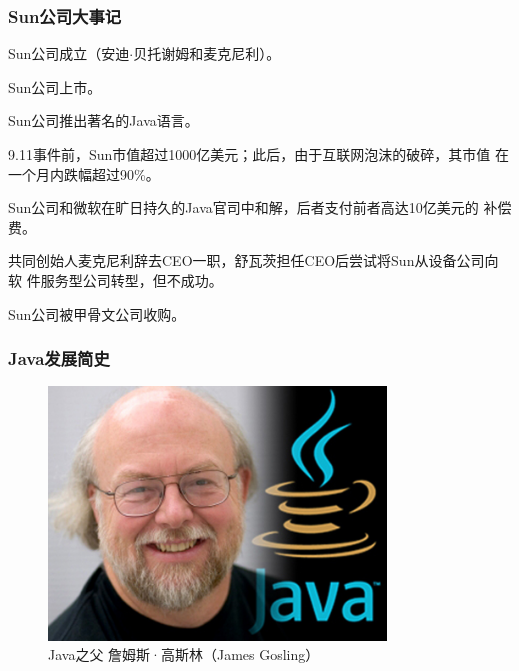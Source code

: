 \documentclass[hyperref={pdfpagelabels=false},compress,table]{beamer} %
\newcommand{\msyh}{\CJKfamily{MSYH}}
\begin{document}
\begin{frame}[fragile] %
\frametitle{Sun公司大事记}
\begin{description}\msyh\small
\item[\fbox{1982}] Sun公司成立（安迪$\cdot$贝托谢姆和麦克尼利）。
\item[\fbox{1986}] Sun公司上市。
\item[\fbox{1985}] Sun公司推出著名的Java语言。
\item[\fbox{2011}] 9.11事件前，Sun市值超过1000亿美元；此后，由于互联网泡沫的破碎，其市值
  在一个月内跌幅超过90\%。
\item[\fbox{2004}] Sun公司和微软在旷日持久的Java官司中和解，后者支付前者高达10亿美元的
  补偿费。
\item[\fbox{2006}] 共同创始人麦克尼利辞去CEO一职，舒瓦茨担任CEO后尝试将Sun从设备公司向软
  件服务型公司转型，但不成功。
\item[\fbox{2010}] Sun公司被甲骨文公司收购。
\end{description}
\end{frame}

\begin{frame}[fragile] %
\frametitle{Java发展简史}
\begin{figure}
\centering
\includegraphics[width=0.80\textwidth]{java-father-gosling.jpg}
\caption{Java之父 詹姆斯·高斯林（James Gosling）}
\end{figure}
\end{frame}
\end{document}
